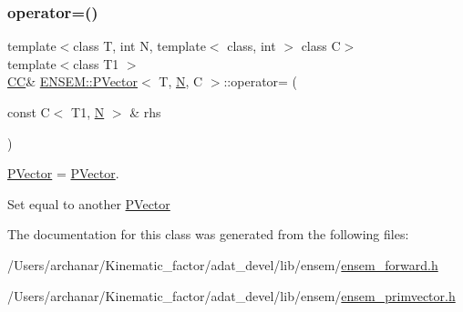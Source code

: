 \subsubsection{\texorpdfstring{operator=()}{operator=()}\hspace{0.1cm}{\footnotesize\ttfamily [2/2]}}
{\footnotesize\ttfamily template$<$class T, int N, template$<$ class, int $>$ class C$>$ \\
template$<$class T1 $>$ \\
\mbox{\hyperlink{classENSEM_1_1PVector_a92dc0a0a301a3dc96f7be5d337019bc7}{CC}}\& \mbox{\hyperlink{classENSEM_1_1PVector}{E\+N\+S\+E\+M\+::\+P\+Vector}}$<$ T, \mbox{\hyperlink{operator__name__util_8cc_a7722c8ecbb62d99aee7ce68b1752f337}{N}}, C $>$\+::operator= (\begin{DoxyParamCaption}\item[{const C$<$ T1, \mbox{\hyperlink{operator__name__util_8cc_a7722c8ecbb62d99aee7ce68b1752f337}{N}} $>$ \&}]{rhs }\end{DoxyParamCaption})\hspace{0.3cm}{\ttfamily [inline]}}



\mbox{\hyperlink{classENSEM_1_1PVector}{P\+Vector}} = \mbox{\hyperlink{classENSEM_1_1PVector}{P\+Vector}}. 

Set equal to another \mbox{\hyperlink{classENSEM_1_1PVector}{P\+Vector}} 

The documentation for this class was generated from the following files\+:\begin{DoxyCompactItemize}
\item 
/\+Users/archanar/\+Kinematic\+\_\+factor/adat\+\_\+devel/lib/ensem/\mbox{\hyperlink{lib_2ensem_2ensem__forward_8h}{ensem\+\_\+forward.\+h}}\item 
/\+Users/archanar/\+Kinematic\+\_\+factor/adat\+\_\+devel/lib/ensem/\mbox{\hyperlink{lib_2ensem_2ensem__primvector_8h}{ensem\+\_\+primvector.\+h}}\end{DoxyCompactItemize}
